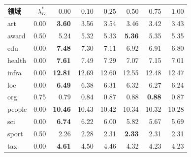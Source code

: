 \begin{tabular}{lrrrrrrr}
\toprule
领域 & $\lambda_D^*$ & $0.00$ & $0.10$ & $0.25$ & $0.50$ & $0.75$ & $1.00$ \\
\midrule
art & 0.00 & \textbf{3.60} & 3.56 & 3.54 & 3.46 & 3.42 & 3.43 \\
award & 0.50 & 5.24 & 5.32 & 5.33 & \textbf{5.36} & 5.35 & 5.35 \\
edu & 0.00 & \textbf{7.48} & 7.30 & 7.11 & 6.92 & 6.91 & 6.80 \\
health & 0.00 & \textbf{7.61} & 7.49 & 7.29 & 7.07 & 7.15 & 7.01 \\
infra & 0.00 & \textbf{12.81} & 12.69 & 12.60 & 12.55 & 12.48 & 12.47 \\
loc & 0.00 & \textbf{6.49} & 6.38 & 6.31 & 6.32 & 6.27 & 6.24 \\
org & 0.75 & 0.79 & 0.84 & 0.87 & 0.88 & \textbf{0.88} & 0.87 \\
people & 0.00 & \textbf{10.46} & 10.43 & 10.42 & 10.34 & 10.32 & 10.28 \\
sci & 0.00 & \textbf{6.74} & 6.22 & 6.00 & 5.82 & 5.67 & 5.69 \\
sport & 0.50 & 2.26 & 2.28 & 2.31 & \textbf{2.33} & 2.31 & 2.31 \\
tax & 0.00 & \textbf{4.61} & 4.50 & 4.46 & 4.32 & 4.23 & 4.23 \\
\bottomrule
\end{tabular}

